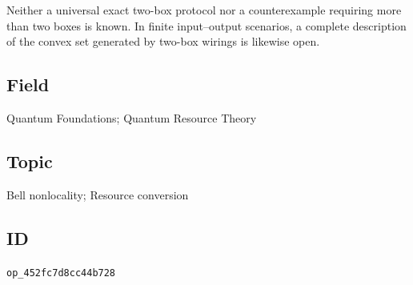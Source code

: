 Neither a universal exact two-box protocol nor a counterexample requiring
more than two boxes is known.  In finite input--output scenarios, a complete
description of the convex set generated by two-box wirings is likewise open.

\subsection*{Field}

Quantum Foundations; Quantum Resource Theory

\subsection*{Topic}

Bell nonlocality; Resource conversion

\subsection*{ID}

\texttt{op\_452fc7d8cc44b728}
